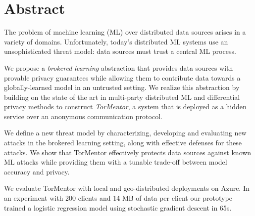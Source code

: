 \chapter{Abstract}

The problem of machine learning (ML) over distributed data sources
arises in a variety of domains. Unfortunately, today's distributed ML
systems use an unsophisticated threat model: data sources must trust a
central ML process.

We propose a \emph{brokered learning} abstraction that provides data
sources with provable privacy guarantees while allowing them to
contribute data towards a globally-learned model in an untrusted
setting. We realize this abstraction by building on the state of the
art in multi-party distributed ML and differential privacy methods to
construct \emph{TorMentor}, a system that is deployed as a hidden
service over an anonymous communication protocol.

We define a new threat model by characterizing, developing and
evaluating new attacks in the brokered learning setting, along with
effective defenses for these attacks. We show that TorMentor
effectively protects data sources against known ML attacks while
providing them with a tunable trade-off between model accuracy and
privacy.

We evaluate TorMentor with local and geo-distributed deployments on
Azure. In an experiment with 200 clients and 14 MB of data per
client our prototype trained a logistic regression model using
stochastic gradient descent in 65s.







%



